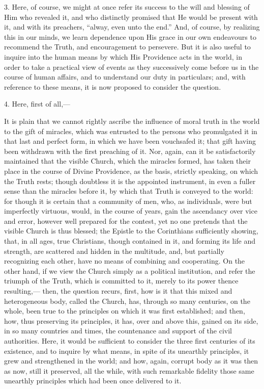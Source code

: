 3. Here, of course, we might at once refer its success to the will
and blessing of Him who revealed it, and who distinctly promised that
He would be present with it, and with its preachers, ``alway, even
unto the end.'' And, of course, by realizing this in our minds, we
learn dependence upon His grace in our own endeavours to recommend the
Truth, and encouragement to persevere. But it is also useful to
inquire into the human means by which His Providence acts in the
world, in order to take a practical view of events as they
successively come before us in the course of human affairs, and to
understand our duty in particulars; and, with reference to these
means, it is now proposed to consider the question.

4. Here, first of all,—

It is plain that we cannot rightly ascribe the influence of moral
truth in the world to the gift of miracles, which was entrusted to the
persons who promulgated it in that last and perfect form, in which we
have been vouchsafed it; that gift having been withdrawn with the
first preaching of it. Nor, again, can it be satisfactorily maintained
that the visible Church, which the miracles formed, has taken their
place in the course of Divine Providence, as the basis, strictly
speaking, on which the Truth rests; though doubtless it is the
appointed instrument, in even a fuller sense than the miracles before
it, by which that Truth is conveyed to the world: for though it is
certain that a community of men, who, as individuals, were but
imperfectly virtuous, would, in the course of years, gain the
ascendancy over vice and error, however well prepared for the contest,
yet no one pretends that the visible Church is thus blessed; the
Epistle to the Corinthians sufficiently showing, that, in all ages,
true Christians, though contained in it, and forming its life and
strength, are scattered and hidden in the multitude, and, but
partially recognizing each other, have no means of combining and
cooperating. On the other hand, if we view the Church simply as a
political institution, and refer the triumph of the Truth, which is
committed to it, merely to its power thence resulting,— then, the
question recurs, first, how is it that this mixed and heterogeneous
body, called the Church, has, through so many centuries, on the whole,
been true to the principles on which it was first established; and
then, how, thus preserving its principles, it has, over and above
this, gained on its side, in so many countries and times, the
countenance and support of the civil authorities. Here, it would be
sufficient to consider the three first centuries of its existence, and
to inquire by what means, in spite of its unearthly principles, it
grew and strengthened in the world; and how, again, corrupt body as it
was then as now, still it preserved, all the while, with such
remarkable fidelity those same unearthly principles which had been
once delivered to it.

